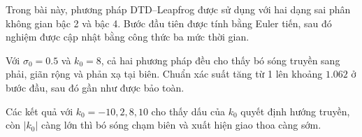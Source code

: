 \documentclass[12pt,a4paper]{article}
\begin{document}
Trong bài này, phương pháp DTD--Leapfrog được sử dụng với hai dạng sai phân không gian bậc 2 và bậc 4. Bước đầu tiên được tính bằng Euler tiến, sau đó nghiệm được cập nhật bằng công thức ba mức thời gian.

Với $\sigma_0=0.5$ và $k_0=8$, cả hai phương pháp đều cho thấy bó sóng truyền sang phải, giãn rộng và phản xạ tại biên. Chuẩn xác suất tăng từ 1 lên khoảng $1.062$ ở bước đầu, sau đó gần như được bảo toàn.

Các kết quả với $k_0=-10,2,8,10$ cho thấy dấu của $k_0$ quyết định hướng truyền, còn $|k_0|$ càng lớn thì bó sóng chạm biên và xuất hiện giao thoa càng sớm.

\end{document}
